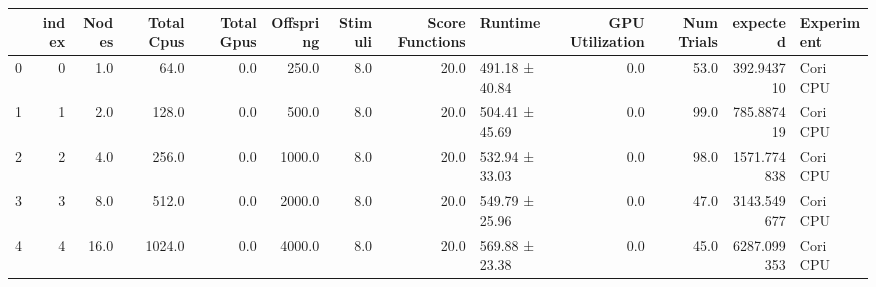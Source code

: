 \begin{tabular}{lrrrrrrrlrrrl}
\toprule
{} &  index &  Nodes &  Total Cpus &  Total Gpus &  Offspring &  Stimuli &  Score Functions &         Runtime &  GPU Utilization &  Num Trials &     expected & Experiment \\
\midrule
0 &      0 &    1.0 &        64.0 &         0.0 &      250.0 &      8.0 &             20.0 &  491.18 ± 40.84 &              0.0 &        53.0 &   392.943710 &   Cori CPU \\
1 &      1 &    2.0 &       128.0 &         0.0 &      500.0 &      8.0 &             20.0 &  504.41 ± 45.69 &              0.0 &        99.0 &   785.887419 &   Cori CPU \\
2 &      2 &    4.0 &       256.0 &         0.0 &     1000.0 &      8.0 &             20.0 &  532.94 ± 33.03 &              0.0 &        98.0 &  1571.774838 &   Cori CPU \\
3 &      3 &    8.0 &       512.0 &         0.0 &     2000.0 &      8.0 &             20.0 &  549.79 ± 25.96 &              0.0 &        47.0 &  3143.549677 &   Cori CPU \\
4 &      4 &   16.0 &      1024.0 &         0.0 &     4000.0 &      8.0 &             20.0 &  569.88 ± 23.38 &              0.0 &        45.0 &  6287.099353 &   Cori CPU \\
\bottomrule
\end{tabular}
